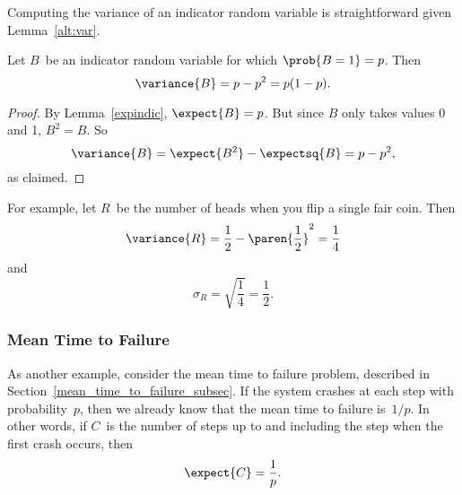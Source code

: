 Computing the variance of an indicator random variable is
straightforward given Lemma~\ref{alt:var}.

\begin{lemma}\label{bernoulli-variance}
Let $B$~be an indicator random variable for which $\prob{B = 1} = p$.
Then
\begin{equation}
    \variance{B} = p-p^2 = p(1-p).
\end{equation}
\end{lemma}

\begin{proof}
  By Lemma~\ref{expindic}, $\expect{B}= p$.  But since $B$ only takes
  values 0 and 1, $B^2 = B$.  So 
\begin{equation*}
    \variance{B} = \expect{B^2} - \expectsq{B} = p - p^2,
\end{equation*}
as claimed.
\end{proof}

For example, let $R$~be the number of heads when you flip a single
fair coin.  Then
\begin{equation}\label{eqn:18H1}
    \variance{R} = \frac{1}{2} - \paren{\frac{1}{2}}^2 = \frac{1}{4}
\end{equation}
and
\begin{equation*}
    \sigma_R = \sqrt{\frac{1}{4}} = \frac{1}{2}.
\end{equation*}

\subsubsection{Mean Time to Failure}

As another example, consider the mean time to failure problem,
described in Section~\ref{mean_time_to_failure_subsec}.  If the system
crashes at each step with probability~$p$, then we already know that
the mean time to failure is~$1/p$.  In other words, if $C$~is the
number of steps up to and including the step when the first crash
occurs, then
\begin{equation*}
    \expect{C} = \frac{1}{p}.
\end{equation*}

